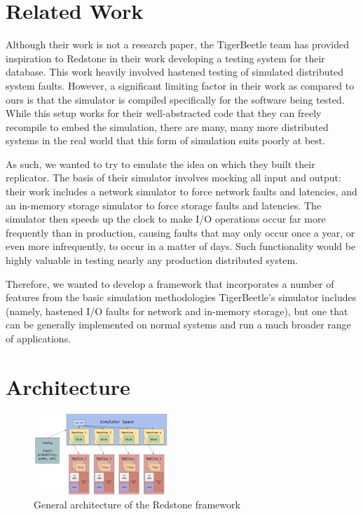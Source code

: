 \section{\txtrsdust Related Work}

{\fontsize{12}{15}\selectfont 
Although their work is not a research paper,
the TigerBeetle \cite{tigerbeetle} team has provided inspiration to Redstone in their work developing a testing system for their database.
This work heavily involved hastened testing of simulated distributed system faults.
However, a significant limiting factor in their work as compared to ours is that the simulator is compiled specifically for the software being tested.
While this setup works for their well-abstracted code that they can freely recompile to embed the simulation,
there are many, many more distributed systems in the real world that this form of simulation suits poorly at best.

As such, we wanted to try to emulate the idea on which they built their replicator.
The basis of their simulator involves mocking all input and output:
their work includes a network simulator to force network faults and latencies,
and an in-memory storage simulator to force storage faults and latencies.
The simulator then speeds up the clock to make I/O operations occur far more frequently than in production,
causing faults that may only occur once a year, or even more infrequently, to occur in a matter of days.
Such functionality would be highly valuable in testing nearly any production distributed system.

Therefore,
we wanted to develop a framework that incorporates a number of features from the basic simulation methodologies
TigerBeetle’s simulator includes (namely, hastened I/O faults for network and in-memory storage),
but one that can be generally implemented on normal systems and run a much broader range of applications.

}

\section{\txtrsdust Architecture}

\begin{figure}
\includegraphics[width=0.45\textwidth]{redstone_architecture.jpeg}
\caption{General architecture of the Redstone framework}
\end{figure}

